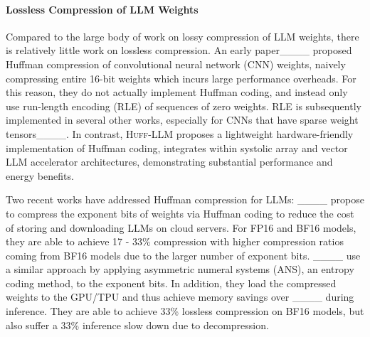 

\paragraph{Lossless Compression of LLM Weights}
Compared to the large body of work on 
lossy compression of LLM weights, there is relatively little work on lossless compression. 
An early paper____ proposed Huffman compression of 
convolutional neural network (CNN) weights, naively compressing entire 16-bit weights which incurs large performance overheads. For this reason, they do not actually implement Huffman coding, and instead only use 
run-length encoding (RLE) of sequences of zero weights. RLE is subsequently 
implemented in several other works, especially for CNNs that have sparse weight tensors____. %
In contrast, \textsc{Huff-LLM} proposes a lightweight 
hardware-friendly implementation of Huffman coding, 
integrates within 
systolic array and vector LLM accelerator architectures, demonstrating 
substantial performance and energy benefits. 

Two recent works have addressed Huffman compression for LLMs: ____ propose to compress the exponent bits of weights via Huffman coding
to reduce the cost of storing and downloading LLMs on cloud servers. For FP16 and BF16 models, they are able to achieve 17 - 33\% compression with higher compression ratios coming from BF16 models due to the larger number of exponent bits. 
____ use a similar approach by applying asymmetric numeral systems (ANS), an entropy coding method,  to the exponent bits. In addition, they load the compressed weights to the GPU/TPU and thus achieve memory savings over ____ during inference. They are able to achieve 33\% lossless compression on BF16 models, but also suffer a 33\% inference slow down due to decompression.


